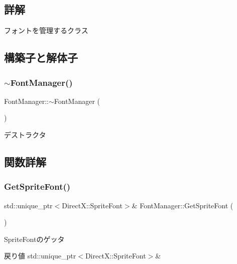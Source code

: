 \subsection{詳解}
フォントを管理するクラス 

\subsection{構築子と解体子}
\mbox{\label{class_font_manager_aa190bb023b4cf2ad28e24c69ef57f380}} 
\subsubsection{\texorpdfstring{$\sim$\+Font\+Manager()}{~FontManager()}}
{\footnotesize\ttfamily Font\+Manager\+::$\sim$\+Font\+Manager (\begin{DoxyParamCaption}{ }\end{DoxyParamCaption})}



デストラクタ 



\subsection{関数詳解}
\mbox{\label{class_font_manager_a612a8922fc977b07959406468dec922f}} 
\subsubsection{\texorpdfstring{Get\+Sprite\+Font()}{GetSpriteFont()}}
{\footnotesize\ttfamily std\+::unique\+\_\+ptr$<$Direct\+X\+::\+Sprite\+Font$>$\& Font\+Manager\+::\+Get\+Sprite\+Font (\begin{DoxyParamCaption}{ }\end{DoxyParamCaption})\hspace{0.3cm}{\ttfamily [inline]}}



Sprite\+Fontのゲッタ 

\begin{DoxyReturn}{戻り値}
std\+::unique\+\_\+ptr$<$\+Direct\+X\+::\+Sprite\+Font$>$\& 
\end{DoxyReturn}
\mbox{\label{class_font_manager_acabba97ebae69b7b92d2ea4a2e9216e4}} 
